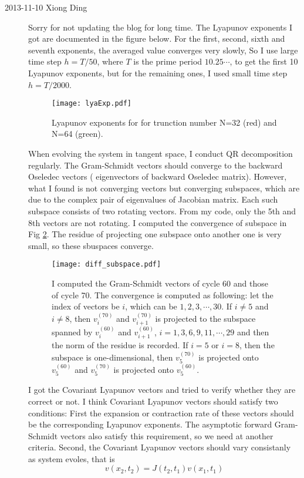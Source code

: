 \begin{description}
\item[2013-11-10 Xiong Ding]
Sorry for not updating the blog for long time. The Lyapunov exponents I got are documented in the figure below. For the first, second, sixth and seventh
exponents, the averaged value converges very slowly, So I use large time step $h=T/50$,
where $T$ is the prime period $10.25\cdots $, to get the first 10 Lyapunov exponents, but for the remaining
ones, I used small time step $h=T/2000$.

\begin{figure}[h]
 \centering
 \texttt{[image: lyaExp.pdf]}
 \caption{Lyapunov exponents for for trunction number N=32 (red) and N=64 (green).}
 \label{fig:lyaExp}
\end{figure}

When evolving the system in tangent space, I conduct QR decomposition regularly. The Gram-Schmidt vectors should
converge to the backward Oseledec vectors ( eigenvectors of backward Oseledec matrix). However, what I found is not
converging vectors but converging subspaces, which are due to the complex pair of eigenvalues of Jacobian matrix. Each such
subspace consists of two rotating vectors.  From my code, only the 5th and 8th vectors are not rotating.  I computed the convergence
of subspace in Fig \ref{fig:diff_subspace}. The residue of projecting one subspace onto another one is very small, so these
sbuspaces converge.

\begin{figure}[h]
 \centering
 \texttt{[image: diff\_subspace.pdf]}
 \caption{I computed the Gram-Schmidt vectors of cycle 60 and those of cycle 70. The convergence is computed as following:
 let the index of vectors be $i$, which can be $1,2,3, \cdots , 30$. If $i\neq 5  $ and $i\neq 8$,  then $v_{i}^{(70)}$ and
 $v_{i+1}^{(70)}$  is projected to  the subspace spanned by $v_{i}^{(60)}$ and  $v_{i+1}^{(60)}$,  $ i=1,3,6,9,11,\cdots ,29$
 and then the norm of the residue is
 recorded. If $i=5$ or $i=8$, then the subspace is one-dimensional, then $v_{5}^{(70)} $ is projected onto $v_{5}^{(60)} $
  and $v_{5}^{(70)} $ is projected onto $v_{5}^{(60)} $.}
 \label{fig:diff_subspace}
\end{figure}

I got the Covariant Lyapunov vectors and tried to verify whether they are correct or not.  I think Covariant Lyapunov
 vectors should satisfy two conditions: First the expansion or
contraction rate of these vectors should be the corresponding Lyapunov exponents.  The asymptotic forward Gram-Schmidt vectors
also satisfy this requirement, so we need at another criteria.
Second, the Covariant Lyapunov vectors should vary consistanly as system evoles, that
is
\begin{equation}
v(x_2, t_2)=J(t_2, t_1)v(x_1, t_1)
\label{eq:clv_consistance}
\end{equation}


\end{description}
